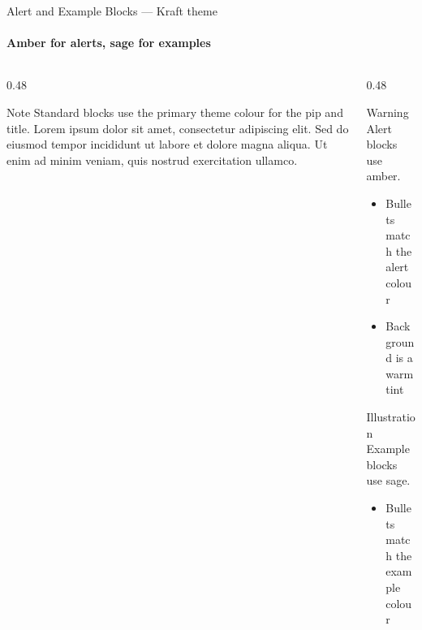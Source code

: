 \documentclass[aspectratio=169]{beamer}
\begin{document}
\begin{frame}{Alert and Example Blocks — Kraft theme}
  \framesubtitle{Amber for alerts, sage for examples}
  \begin{columns}[T]
    \begin{column}{0.48\textwidth}
      \begin{block}{Note}
        Standard blocks use the primary theme colour for the pip
        and title. Lorem ipsum dolor sit amet, consectetur
        adipiscing elit. Sed do eiusmod tempor incididunt ut
        labore et dolore magna aliqua. Ut enim ad minim veniam,
        quis nostrud exercitation ullamco.
      \end{block}
    \end{column}
    \begin{column}{0.48\textwidth}
      \begin{alertblock}{Warning}
        Alert blocks use amber.
        \begin{itemize}
          \item Bullets match the alert colour
          \item Background is a warm tint
        \end{itemize}
      \end{alertblock}
      \begin{exampleblock}{Illustration}
        Example blocks use sage.
        \begin{itemize}
          \item Bullets match the example colour
        \end{itemize}
      \end{exampleblock}
    \end{column}
  \end{columns}
\end{frame}
\end{document}
